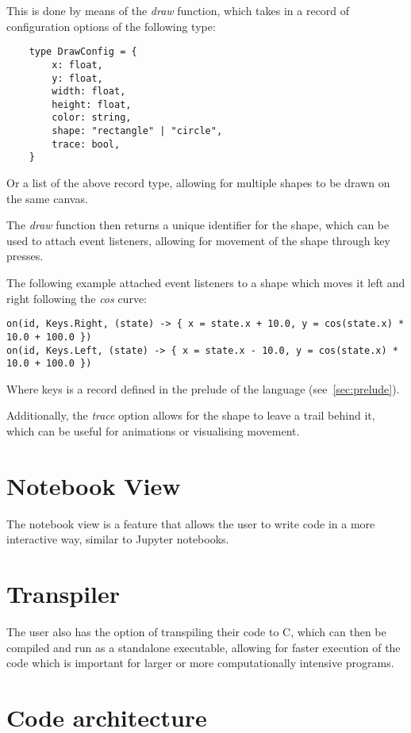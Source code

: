 This is done by means of the \textit{draw} function, which takes in a record of configuration options of the following
type:

\begin{verbatim}
    type DrawConfig = {
        x: float,
        y: float,
        width: float,
        height: float,
        color: string,
        shape: "rectangle" | "circle",
        trace: bool, 
    }
\end{verbatim}

Or a list of the above record type, allowing for multiple shapes to be drawn on the same canvas.

The \textit{draw} function then returns a unique identifier for the shape, which can be used to attach event 
listeners, allowing for movement of the shape through key presses.

The following example attached event listeners to a shape which moves it left and right following the \textit{cos} curve:

\begin{verbatim}
on(id, Keys.Right, (state) -> { x = state.x + 10.0, y = cos(state.x) * 10.0 + 100.0 })
on(id, Keys.Left, (state) -> { x = state.x - 10.0, y = cos(state.x) * 10.0 + 100.0 })
\end{verbatim}

Where keys is a record defined in the prelude of the language (see~\autoref{sec:prelude}).

Additionally, the \textit{trace} option allows for the shape to leave a trail behind it, which can be useful for
animations or visualising movement.


\section{Notebook View}\label{sec:notebook-view}

The notebook view is a feature that allows the user to write code in a more interactive way, similar to Jupyter
notebooks\citep{Jupyter}.

\section{Transpiler}\label{sec:transpiler}

The user also has the option of transpiling their code to C, which can then be compiled and run as a standalone
executable, allowing for faster execution of the code which is important for larger or more computationally
intensive programs.

\section{Code architecture}\label{sec:code-architecture}